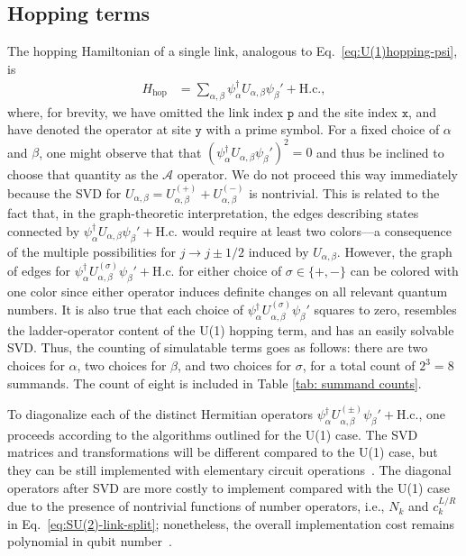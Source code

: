 \documentclass[aps,prd,twocolumn,showpacs,groupedaddress,superscriptaddress,nofootinbib,floatfix,preprintnumbers,longbibliography]{revtex4-1}
\begin{document}
\subsection{Hopping terms}
The hopping Hamiltonian of a single link, analogous to Eq.~\eqref{eq:U(1)hopping-psi}, is
%
\begin{align}
    H_{\mathrm{hop}} &= \sum_{\alpha,\beta} \psi^\dagger_\alpha U_{\alpha,\beta}\psi_\beta ' + \mathrm{H.c.},
\end{align}
%
where, for brevity, we have omitted the link index $\mathtt{p}$ and the site index $\mathtt{x}$, and have denoted the operator at site $\mathtt{y}$ with a prime symbol.
For a fixed choice of $\alpha$ and $\beta$, one might observe that that $(\psi^\dagger_\alpha U_{\alpha,\beta}\psi_\beta ')^2=0$ and thus be inclined to choose that quantity as the $\mathscr{A}$ operator.
We do not proceed this way immediately because the SVD for $U_{\alpha,\beta}=U_{\alpha,\beta}^{(+)} + U_{\alpha,\beta}^{(-)}$ is nontrivial.
This is related to the fact that, in the graph-theoretic interpretation, the edges describing states connected by $\psi^\dagger_\alpha U_{\alpha,\beta}\psi_\beta '+\mathrm{H.c.}$ would require at least two colors---a consequence of the multiple possibilities for $j \to j\pm1/2$ induced by $U_{\alpha,\beta}$.
However, the graph of edges for $\psi^\dagger_\alpha U_{\alpha,\beta}^{(\sigma)}\psi_\beta '+\mathrm{H.c.}$ for either choice of $\sigma\in \{+,-\}$ can be colored with one color since either operator induces definite changes on all relevant quantum numbers.
It is also true that each choice of $\psi^\dagger_\alpha U_{\alpha,\beta}^{(\sigma)}\psi_\beta '$ squares to zero, resembles the ladder-operator content of the U(1) hopping term, and has an easily solvable SVD.
Thus, the counting of simulatable terms goes as follows: there are two choices for $\alpha$, two choices for $\beta$, and two choices for $\sigma$, for a total count of $2^3=8$ summands.
The count of eight is included in Table \ref{tab: summand counts}.

To diagonalize each of the distinct Hermitian operators $\psi^\dagger_\alpha U_{\alpha,\beta}^{(\pm)} \psi_\beta' + \text{H.c.}$, one proceeds according to the algorithms outlined for the U(1) case. The SVD matrices and transformations will be different compared to the U(1) case, but they can be still implemented with elementary circuit operations~\cite{Davoudi:2022xmb}. The diagonal operators after SVD are more costly to implement compared with the U(1) case due to the presence of nontrivial functions of number operators, i.e., $N_k$ and $c^{L/R}_{k}$ in Eq.~\eqref{eq:SU(2)-link-split}; nonetheless, the overall implementation cost remains polynomial in qubit number~\cite{Davoudi:2022xmb,Kan:2021xfc}. 
\end{document}
